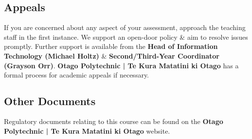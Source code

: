\documentclass{article}
\begin{document}
\subsection*{Appeals}
If you are concerned about any aspect of your assessment, approach the teaching staff in the first instance. We support an open-door policy \& aim to resolve issues promptly. Further support is available from the \textbf{Head of Information Technology (Michael Holtz)} \& \textbf{Second/Third-Year Coordinator (Grayson Orr)}. \textbf{Otago Polytechnic | Te Kura Matatini ki Otago} has a formal process for academic appeals if necessary.

\subsection*{Other Documents}
Regulatory documents relating to this course can be found on the \textbf{Otago Polytechnic | Te Kura Matatini ki Otago} website.
\end{document}
